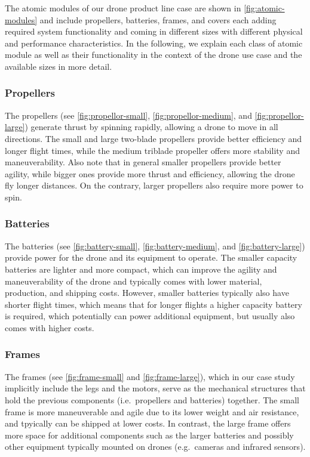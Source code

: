 \documentclass[sigconf,review]{acmart}
\begin{document}
The atomic modules of our drone product line case are shown in \cref{fig:atomic-modules} and include propellers, batteries, frames, and covers each adding required system functionality and coming in different sizes with different physical and performance characteristics.
In the following, we explain each class of atomic module as well as their functionality in the context of the drone use case and the available sizes in more detail.

\subsubsection*{Propellers}
\label{sec:propellers}

The propellers (see \cref{fig:propellor-small}, \cref{fig:propellor-medium}, and \cref{fig:propellor-large}) generate thrust by spinning rapidly, allowing a drone to move in all directions. 
The small and large two-blade propellers provide better efficiency and longer flight times, while the medium triblade propeller offers more stability and maneuverability. 
Also note that in general smaller propellers provide better agility, while bigger ones provide more thrust and efficiency, allowing the drone fly longer distances.
On the contrary, larger propellers also require more power to spin.

\subsubsection*{Batteries}
\label{sec:batteries}

The batteries (see \cref{fig:battery-small}, \cref{fig:battery-medium}, and \cref{fig:battery-large}) provide power for the drone and its equipment to operate. 
The smaller capacity batteries are lighter and more compact, which can improve the agility and maneuverability of the drone and typically comes with lower material, production, and shipping costs.
However, smaller batteries typically also have shorter flight times, which means that for longer flights a higher capacity battery is required, which potentially can power additional equipment, but usually also comes with higher costs.

\subsubsection*{Frames}
\label{sec:frames}

The frames (see \cref{fig:frame-small} and \cref{fig:frame-large}), which in our case study implicitly include the legs and the motors, serve as the mechanical structures that hold the previous components (i.e.\ propellers and batteries) together.
The small frame is more maneuverable and agile due to its lower weight and air resistance, and tpyically can be shipped at lower costs.
In contrast, the large frame offers more space for additional components such as the larger batteries and possibly other equipment typically mounted on drones (e.g.\ cameras and infrared sensors).
\end{document}
